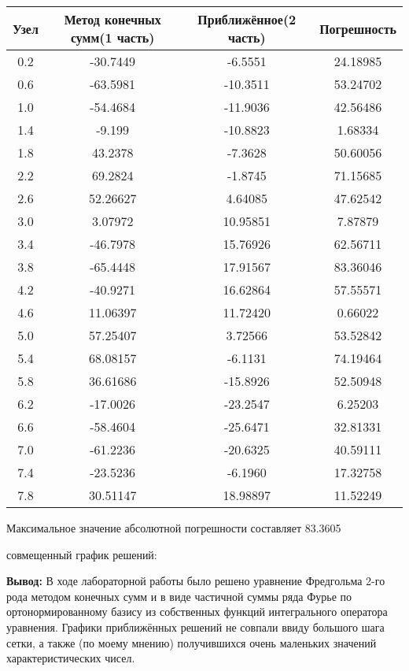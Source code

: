 \documentclass[12pt]{article}
\begin{document}
\begin{center}
  \begin{tabular}{|c|c|c|c|}
 \hline
 Узел & Метод конечных сумм(1 часть) & Приближённое(2 часть) & Погрешность\\
 \hline
0.2 & -30.7449 & -6.5551 & 24.18985 \\
0.6 & -63.5981 & -10.3511 & 53.24702 \\
1.0 & -54.4684 & -11.9036 & 42.56486 \\
1.4 & -9.199 & -10.8823 & 1.68334 \\
1.8 & 43.2378 & -7.3628 & 50.60056 \\
2.2 & 69.2824 & -1.8745 & 71.15685 \\
2.6 & 52.26627 & 4.64085 & 47.62542 \\
3.0 & 3.07972 & 10.95851 & 7.87879 \\
3.4 & -46.7978 & 15.76926 & 62.56711 \\
3.8 & -65.4448 & 17.91567 & 83.36046 \\
4.2 & -40.9271 & 16.62864 & 57.55571 \\
4.6 & 11.06397 & 11.72420 & 0.66022 \\
5.0 & 57.25407 & 3.72566 & 53.52842 \\
5.4 & 68.08157 & -6.1131 & 74.19464 \\
5.8 & 36.61686 & -15.8926 & 52.50948 \\
6.2 & -17.0026 & -23.2547 & 6.25203 \\
6.6 & -58.4604 & -25.6471 & 32.81331 \\
7.0 & -61.2236 & -20.6325 & 40.59111 \\
7.4 & -23.5236 & -6.1960 & 17.32758 \\
7.8 & 30.51147 & 18.98897 & 11.52249 \\

 \hline
\end{tabular}
\end{center}

\indent Максимальное значение абсолютной погрешности составляет 83.3605

\newpage
{} совмещенный график решений:
\begin{figure}[h!]
	\centering
\end{figure}

\textbf{Вывод: }В ходе лабораторной работы было решено уравнение Фредгольма 2-го рода методом конечных сумм и в виде
частичной суммы ряда Фурье по ортонормированному базису из собственных
функций интегрального оператора уравнения. Графики приближённых решений не совпали ввиду большого шага сетки, а также (по моему мнению) получившихся очень маленьких значений характеристических чисел.
\end{document}
